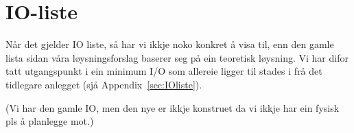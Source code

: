 \section{IO-liste}
\thispagestyle{fancy}

Når det gjelder \gls{IO} liste, så har vi ikkje noko konkret å visa til, enn den gamle lista sidan våra løysningsforslag baserer seg på ein teoretisk løysning.
Vi har difor tatt utgangspunkt i ein minimum I/O som allereie ligger til stades i frå det tidlegare anlegget (sjå Appendix~\ref{sec:IOliste}). 







(Vi har den gamle IO, men den nye er ikkje konstruet da vi ikkje har ein fysisk pls å planlegge mot.)

\newpage
